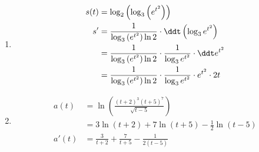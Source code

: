 \begin{enumerate}
\begin{enumerate}
        
        
        
        \item \begin{align*} 
        	s(t) &= \log_2\left(\log_3\left(e^{t^2}\right)\right) \\
            s' 
            &= \frac{1}{\log_3\left(e^{t^2}\right) \ln 2} \cdot \ddt  \left( \log_3 e^{t^2} \right) \\
            &= \frac{1}{\log_3\left(e^{t^2}\right) \ln 2} \cdot  \frac{1}{ \log_3 e^{t^2}} \cdot \ddt e^{t^2} \\
            &= \frac{1}{\log_3\left(e^{t^2}\right) \ln 2} \cdot  \frac{1}{ \log_3 e^{t^2}} \cdot e^{t^2} \cdot 2t           
        \end{align*}
        
        
        \item \begin{align*}
        a(t) 
        &= \ln\left(\frac{(t+2)^3(t+5)^7}{\sqrt{t-5}}\right) \\
        &= 3 \ln\left(t+2 \right) + 7 \ln\left(t+5\right) - \frac 1 2 \ln \left( t-5\right) \\
        a'(t) &= \frac{3}{t+2} +\frac{7}{t+5} - \frac{1}{2(t-5)} 
        \end{align*}
    \end{enumerate}
    
    
    
    
    
    
    

\end{enumerate}

